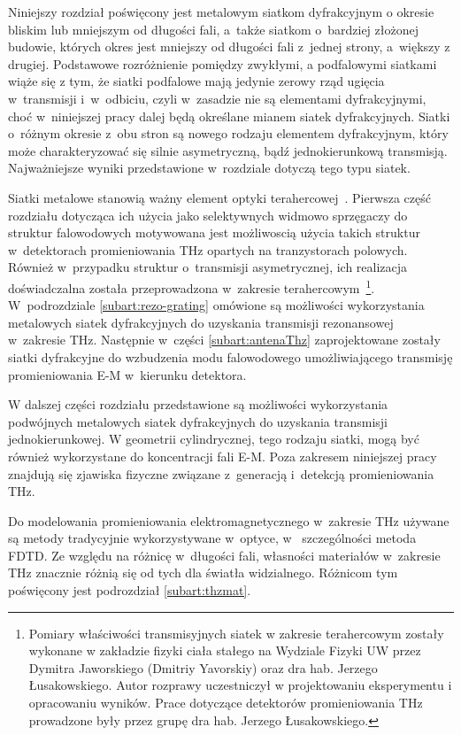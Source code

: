 Niniejszy rozdział poświęcony jest metalowym siatkom dyfrakcyjnym o okresie bliskim lub mniejszym od długości fali, a~także siatkom o~bardziej złożonej budowie, których okres jest mniejszy od długości fali z~jednej strony, a~większy z drugiej. Podstawowe rozróżnienie pomiędzy zwykłymi, a podfalowymi siatkami wiąże się z tym, że siatki podfalowe mają jedynie zerowy rząd ugięcia w~transmisji i~w~odbiciu, czyli w~zasadzie nie są elementami dyfrakcyjnymi, choć w~niniejszej pracy dalej będą określane mianem siatek dyfrakcyjnych. Siatki o~różnym okresie z~obu stron są nowego rodzaju elementem dyfrakcyjnym, który może charakteryzować się silnie asymetryczną, bądź jednokierunkową transmisją. Najważniejsze wyniki przedstawione w~rozdziale dotyczą tego typu siatek.

Siatki metalowe stanowią ważny element optyki terahercowej~\cite{zhang2010introduction}. Pierwsza część rozdziału dotycząca ich użycia jako selektywnych widmowo sprzęgaczy do struktur falowodowych motywowana jest możliwoscią użycia takich struktur w~detektorach promieniowania THz opartych na tranzystorach polowych. Również w~przypadku struktur o~transmisji asymetrycznej, ich realizacja doświadczalna została przeprowadzona w~zakresie terahercowym~\footnote{Pomiary właściwości transmisyjnych siatek w zakresie terahercowym zostały wykonane w zakładzie fizyki ciała stałego na Wydziale Fizyki UW przez Dymitra Jaworskiego (Dmitriy Yavorskiy) oraz dra hab. Jerzego Łusakowskiego. Autor rozprawy uczestniczył w projektowaniu eksperymentu i opracowaniu wyników. Prace dotyczące detektorów promieniowania THz prowadzone były przez grupę dra hab. Jerzego Łusakowskiego.}. W~podrozdziale \ref{subart:rezo-grating} omówione są możliwości wykorzystania metalowych siatek dyfrakcyjnych do uzyskania transmisji rezonansowej w~zakresie THz. Następnie w~części \ref{subart:antenaThz} zaprojektowane zostały siatki dyfrakcyjne do wzbudzenia modu falowodowego umożliwiającego transmisję promieniowania E-M w~kierunku detektora.

W dalszej części rozdziału przedstawione są możliwości wykorzystania podwójnych metalowych siatek dyfrakcyjnych do uzyskania transmisji jednokierunkowej. W geometrii cylindrycznej, tego rodzaju siatki, mogą być również wykorzystane do koncentracji fali E-M. Poza zakresem niniejszej pracy znajdują się zjawiska fizyczne związane z~generacją i~detekcją promieniowania THz.

Do modelowania promieniowania elektromagnetycznego w~zakresie THz używane są metody tradycyjnie wykorzystywane w~optyce, w~ szczególności metoda FDTD. Ze względu na różnicę w~długości fali, własności materiałów w~zakresie THz znacznie różnią się od tych dla światła widzialnego. Różnicom tym poświęcony jest podrozdział \ref{subart:thzmat}.
